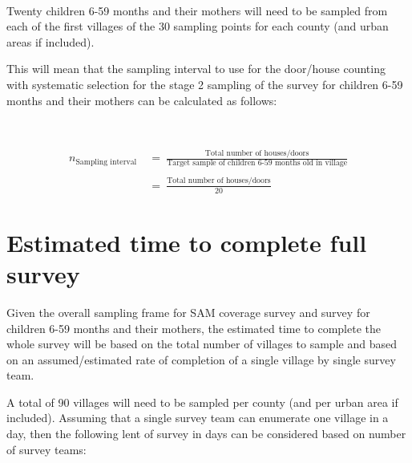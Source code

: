 \documentclass[12pt,a4paper]{book}
\theoremstyle{definition}
\theoremstyle{definition}
\theoremstyle{definition}
\theoremstyle{remark}
\begin{document}
~

Twenty children 6-59 months and their mothers will need to be sampled
from each of the first villages of the 30 sampling points for each
county (and urban areas if included).

This will mean that the sampling interval to use for the door/house
counting with systematic selection for the stage 2 sampling of the
survey for children 6-59 months and their mothers can be calculated as
follows:

~

\[\begin{aligned}
n_{\text{Sampling interval}} & ~ = ~ \frac{\text{Total number of houses/doors}}{\text{Target sample of children 6-59 months old in village}} \\
\\
& ~ = ~ \frac{\text{Total number of houses/doors}}{\text{20}}
\end{aligned}\]

\newpage

\hypertarget{estimated-time-to-complete-full-survey}{%
\section{Estimated time to complete full
survey}\label{estimated-time-to-complete-full-survey}}

Given the overall sampling frame for SAM coverage survey and survey for
children 6-59 months and their mothers, the estimated time to complete
the whole survey will be based on the total number of villages to sample
and based on an assumed/estimated rate of completion of a single village
by single survey team.

A total of 90 villages will need to be sampled per county (and per urban
area if included). Assuming that a single survey team can enumerate one
village in a day, then the following lent of survey in days can be
considered based on number of survey teams:

~
\end{document}
